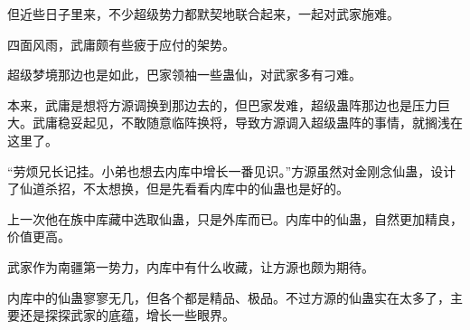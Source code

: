 \begin{this_body}
但近些日子里来，不少超级势力都默契地联合起来，一起对武家施难。

四面风雨，武庸颇有些疲于应付的架势。

超级梦境那边也是如此，巴家领袖一些蛊仙，对武家多有刁难。

本来，武庸是想将方源调换到那边去的，但巴家发难，超级蛊阵那边也是压力巨大。武庸稳妥起见，不敢随意临阵换将，导致方源调入超级蛊阵的事情，就搁浅在这里了。

“劳烦兄长记挂。小弟也想去内库中增长一番见识。”方源虽然对金刚念仙蛊，设计了仙道杀招，不太想换，但是先看看内库中的仙蛊也是好的。

上一次他在族中库藏中选取仙蛊，只是外库而已。内库中的仙蛊，自然更加精良，价值更高。

武家作为南疆第一势力，内库中有什么收藏，让方源也颇为期待。

内库中的仙蛊寥寥无几，但各个都是精品、极品。不过方源的仙蛊实在太多了，主要还是探探武家的底蕴，增长一些眼界。

\end{this_body}

